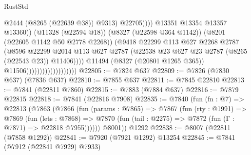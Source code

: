 \begin{lexlean}{RustStd}
\begin{coremodule}
                                                          @2444
                                                          (@8265 (@22639 @38))
                                                          @9313)
                                                        @22705))))
                                                @13351
                                                @13354
                                                @13357
                                                @13360))
                                            (@11328 (@22594 @18))
                                            (@8327 (@22598 @364 @1142))
                                            (@8201 (@22605 @1142 @50 @2778 @2268))
                                            (@9418
                                              @22299
                                              @113
                                              @627
                                              @2268
                                              @2787
                                              (@8596
                                                @22299
                                                @2014
                                                @113
                                                @627
                                                @2787
                                                (@22538
                                                  @23
                                                  @627
                                                  @23
                                                  @2787
                                                  (@8265 (@22543 @23))
                                                  @11406))))
                                          @11494
                                          (@8327 (@20801 @1265 @365))
                                          @11506)))))))))))))))))))
@22805 := @7824 @637
@22809 := @7826 (@7830 @637) (@7836 @637)
@22810 := @7855 @637
@22811 := @7845 @22810
@22813 := @7841 (@22811 @7860)
@22815 := @7883 (@7884 @637)
@22816 := @7879 @22815
@22818 := @7841 (@22816 @7908)
@22835 := @7840
    (fun (fn : @7) =>
    @22813
      (@7863
        (@7866
          (fun (params : @7865) =>
          @7867
            (fun (rty : @1991) =>
            @7869
              (fun (lets : @7868) =>
              @7870 (fun (tail : @2275) => @7872 (fun (Γ : @7871) => @22818 @7955))))))
        @8001))
    @1292
@22838 := @8007 (@22811 (@7858 @1292))
@22841 := @7920 (@7921 @1292) @13254
@22845 := @7841 (@7912 (@22841 @7929) @7933)

\end{coremodule}
\end{lexlean}
